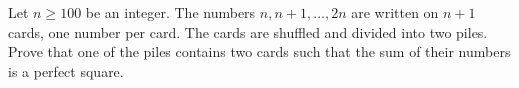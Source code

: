 Let $n \geq 100$ be an integer. The numbers $n, n+1, \ldots, 2n$ are written on $n+1$ cards, one number per card. The cards are shuffled and divided into two piles. Prove that one of the piles contains two cards such that the sum of their numbers is a perfect square.
